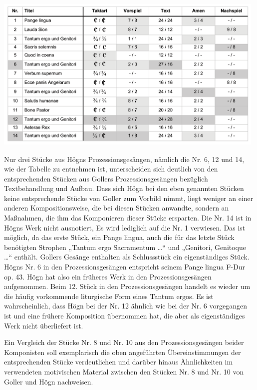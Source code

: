 {%
\includegraphics[width=13.088cm,height=7.486cm]{pictures/zulassungsarbeit-img082.png}
 \par}
Nur drei Stücke aus Högns Prozessionsgesängen, nämlich die Nr. 6, 12 und
14, wie der Tabelle zu entnehmen ist, unterscheiden sich deutlich von
den entsprechenden Stücken aus Gollers Prozessionsgesängen bezüglich
Textbehandlung und Aufbau. Dass sich Högn bei den eben genannten
Stücken keine entsprechende Stücke von Goller zum Vorbild nimmt, liegt
weniger an einer anderen Kompositionsweise, die bei diesen Stücken
anwandte, sondern an Maßnahmen, die ihm das Komponieren dieser Stücke
ersparten. Die Nr. 14 ist in Högns Werk nicht ausnotiert, Es wird
lediglich auf die Nr. 1 verwiesen. Das ist möglich, da das erste Stück,
ein Pange lingua, auch die für das letzte Stück benötigten Strophen
„Tantum ergo Sacramentum …“ und „Genitori, Genitoque …“ enthält.
Gollers Gesänge enthalten als Schlussstück ein eigenständiges Stück.
Högns Nr. 6 in den Prozessionsgesängen entspricht seinem Pange lingua
F-Dur op. 43. Högn hat also ein früheres Werk in den
Prozessionsgesängen aufgenommen. Beim 12. Stück in den
Prozessionsgesängen handelt es wieder um die häufig vorkommende
liturgische Form eines Tantum ergos. Es ist wahrscheinlich, dass Högn
bei der Nr. 12 ähnlich wie bei der Nr. 6 vorgegangen ist und eine
frühere Komposition übernommen hat, die aber als eigenständiges Werk
nicht überliefert ist.

Ein Vergleich der Stücke Nr. 8 und Nr. 10 aus den Prozessionsgesängen
beider Komponisten soll exemplarisch die oben angeführten
Übereinstimmungen der entsprechenden Stücke verdeutlichen und darüber
hinaus Ähnlichkeiten im verwendeten motivischen Material zwischen den
Stücken Nr. 8 und Nr. 10 von Goller und Högn nachweisen.


